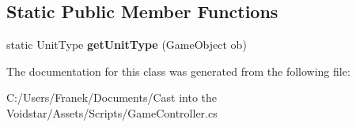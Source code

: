 \subsection*{Static Public Member Functions}
\begin{DoxyCompactItemize}
\item 
\hypertarget{class_game_controller_1_1_player_a0e2648f9c886f3ca4b7484f96694187d}{}static Unit\+Type {\bfseries get\+Unit\+Type} (Game\+Object ob)\label{class_game_controller_1_1_player_a0e2648f9c886f3ca4b7484f96694187d}

\end{DoxyCompactItemize}


The documentation for this class was generated from the following file\+:\begin{DoxyCompactItemize}
\item 
C\+:/\+Users/\+Franek/\+Documents/\+Cast into the Voidstar/\+Assets/\+Scripts/Game\+Controller.\+cs\end{DoxyCompactItemize}
